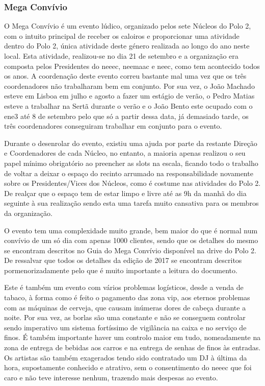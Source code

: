 
\subsubsection{Mega Convívio}

O Mega Convívio é um evento lúdico, organizado pelos sete Núcleos do Polo 2, com o intuito principal de receber os caloiros e proporcionar uma atividade dentro do Polo 2, única atividade deste género realizada ao longo do ano neste local. Esta atividade, realizou-se no dia 21 de setembro e a organização era composta pelos Presidentes do \acrshort{neeec}, \acrshort{neemaac} e \acrshort{neec}, como tem acontecido todos os anos. A coordenação deste evento correu bastante mal uma vez que os três coordenadores não trabalharam bem em conjunto. Por sua vez, o João Machado esteve em Lisboa em julho e agosto a fazer um estágio de verão, o Pedro Matias esteve a trabalhar na Sertã durante o verão e o João Bento este ocupado com o \acrshort{ene3} até 8 de setembro pelo que só a partir dessa data, já demasiado tarde, os três coordenadores conseguiram trabalhar em conjunto para o evento.

Durante o desenrolar do evento, existiu uma ajuda por parte da restante Direção e Coordenadores de cada Núcleo, no entanto, a maioria apenas realizou o seu papel mínimo obrigatório ao preencher as slots na escala, ficando todo o trabalho de voltar a deixar o espaço do recinto arrumado na responsabilidade novamente sobre os Presidentes/Vices dos Núcleos, como é costume nas atividades do Polo 2. De realçar que o espaço tem de estar limpo e livre até as 9h da manhã do dia seguinte à sua realização sendo esta uma tarefa muito cansativa para os membros da organização.

O evento tem uma complexidade muito grande, bem maior do que é normal num convívio de um só dia com apenas 1000 clientes, sendo que os detalhes do mesmo se encontram descritos no Guia do Mega Convívio disponível na drive do Polo 2. De ressalvar que todos os detalhes da edição de 2017 se encontram descritos pormenorizadamente pelo que é muito importante a leitura do documento.

Este é também um evento com vários problemas logísticos, desde a venda de tabaco, à forma como é feito o pagamento das zona vip, aos eternos problemas com as máquinas de cerveja, que causam inúmeras dores de cabeça durante a noite. Por sua vez, as borlas são uma constante e não se conseguem controlar sendo imperativo um sistema fortíssimo de vigilância na caixa e no serviço de finos. É também importante haver um controlo maior em tudo, nomeadamente na zona de entrega de bebidas aos carros e na entrega de senhas de finos às entradas. Os artistas são também exagerados tendo sido contratado um DJ à última da hora, supostamente conhecido e atrativo, sem o consentimento do \acrshort{neeec} que foi caro e não teve interesse nenhum, trazendo mais despesas ao evento.

